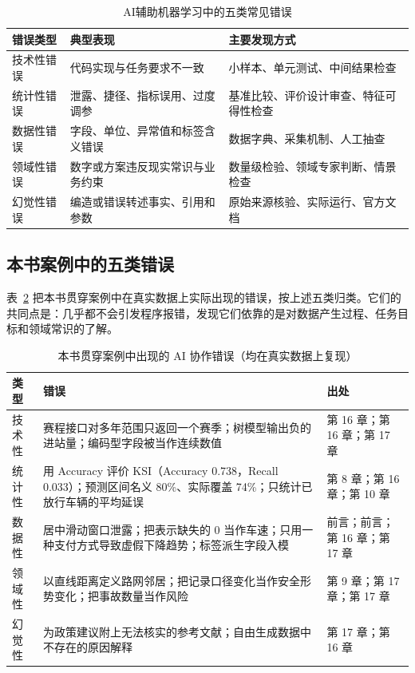 \begin{table}[H]
\centering
\caption{AI辅助机器学习中的五类常见错误}
\label{tab:five_errors}
\begin{tabular}{p{2.2cm}p{5.0cm}p{5.2cm}}
\toprule
错误类型 & 典型表现 & 主要发现方式 \\
\midrule
技术性错误 & 代码实现与任务要求不一致 & 小样本、单元测试、中间结果检查 \\
统计性错误 & 泄露、捷径、指标误用、过度调参 & 基准比较、评价设计审查、特征可得性检查 \\
数据性错误 & 字段、单位、异常值和标签含义错误 & 数据字典、采集机制、人工抽查 \\
领域性错误 & 数字或方案违反现实常识与业务约束 & 数量级检验、领域专家判断、情景检查 \\
幻觉性错误 & 编造或错误转述事实、引用和参数 & 原始来源核验、实际运行、官方文档 \\
\bottomrule
\end{tabular}
\end{table}

\subsection{本书案例中的五类错误}

表~\ref{tab:ch12_book_cases} 把本书贯穿案例中在真实数据上实际出现的错误，按上述五类归类。它们的共同点是：几乎都不会引发程序报错，发现它们依靠的是对数据产生过程、任务目标和领域常识的了解。

\begin{table}[H]
\centering
\caption{本书贯穿案例中出现的 AI 协作错误（均在真实数据上复现）}
\label{tab:ch12_book_cases}
\small
\begin{tabular}{p{1.6cm}p{6.6cm}p{4.6cm}}
\toprule
类型 & 错误 & 出处 \\
\midrule
技术性 & 赛程接口对多年范围只返回一个赛季；树模型输出负的进站量；编码型字段被当作连续数值 & 第 16 章；第 16 章；第 17 章 \\
统计性 & 用 Accuracy 评价 KSI（Accuracy 0.738，Recall 0.033）；预测区间名义 80\%、实际覆盖 74\%；只统计已放行车辆的平均延误 & 第 8 章；第 16 章；第 10 章 \\
数据性 & 居中滑动窗口泄露；把表示缺失的 0 当作车速；只用一种支付方式导致虚假下降趋势；标签派生字段入模 & 前言；前言；第 16 章；第 17 章 \\
领域性 & 以直线距离定义路网邻居；把记录口径变化当作安全形势变化；把事故数量当作风险 & 第 9 章；第 17 章；第 17 章 \\
幻觉性 & 为政策建议附上无法核实的参考文献；自由生成数据中不存在的原因解释 & 第 17 章；第 16 章 \\
\bottomrule
\end{tabular}
\end{table}


